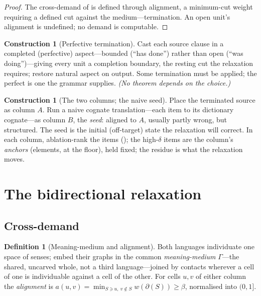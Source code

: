 \documentclass[11pt,a4paper]{article}
\theoremstyle{thmstyle}
\theoremstyle{definition}
\newtheorem{definition}[theorem]{Definition}
\newtheorem{construction}[theorem]{Construction}
\theoremstyle{remark}
\newcommand{\Gph}{\Gamma}
\newcommand{\wt}{w}
\newcommand{\flo}{\beta}               %
\newcommand{\cut}{\partial}            %
\newcommand{\align}{a}                 %
\newcommand{\abl}{\delta}              %
\newcommand{\colA}{A}                  %
\newcommand{\colB}{B}                  %
\begin{document}
\begin{proof}
The cross-demand of  is defined through alignment, a
minimum-cut weight requiring a defined cut against the medium---termination.
An open unit's alignment is undefined; no demand is computable.
\end{proof}

\begin{construction}[Perfective termination]
\label{con:perfective}
Cast each source clause in a completed (perfective) aspect---bounded
(``has done'') rather than open (``was doing'')---giving every unit a
completion boundary, the resting cut the relaxation requires; restore natural
aspect on output. Some termination must be applied; the perfect is one the
grammar supplies. \textit{(No theorem depends on the choice.)}
\end{construction}

\begin{construction}[The two columns; the naive seed]
\label{con:columns}
Place the terminated source as column $\colA$. Run a naive cognate
translation---each item to its dictionary cognate---as column $\colB$,
the \emph{seed}: aligned to $\colA$, usually partly wrong, but structured.
The seed is the initial (off-target) state the relaxation will correct. In
each column, ablation-rank the items (); the high-$\abl$
items are the column's \emph{anchors} (elements, at the floor), held fixed;
the residue is what the relaxation moves.
\end{construction}

\section{The bidirectional relaxation}
\label{sec:relaxation}

\subsection{Cross-demand}

\begin{definition}[Meaning-medium and alignment]
\label{def:alignment}
Both languages individuate one space of senses; embed their graphs in the
common \emph{meaning-medium} $\Gph$---the shared, uncarved whole, not a third
language---joined by contacts wherever a cell of one is individuable against a
cell of the other. For cells $u,v$ of either column the \emph{alignment} is
$\align(u,v)=\min_{S\ni u,\ v\notin S}\wt(\cut(S))\ge\flo$, normalised into
$(0,1]$.
\end{definition}
\end{document}
